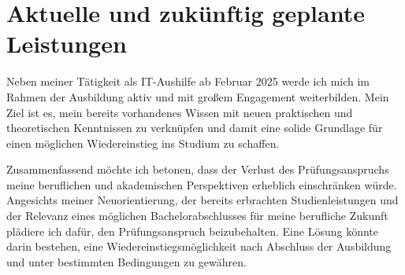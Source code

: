 \documentclass[a4paper,12pt]{article}
\begin{document}
\section*{\normalsize Aktuelle und zukünftig geplante Leistungen}
Neben meiner Tätigkeit als IT-Aushilfe ab Februar 2025 werde ich mich im Rahmen der Ausbildung aktiv und mit großem Engagement weiterbilden.
Mein Ziel ist es, mein bereits vorhandenes Wissen mit neuen praktischen und theoretischen Kenntnissen zu verknüpfen und damit eine solide Grundlage für einen möglichen Wiedereinstieg ins Studium zu schaffen.

Zusammenfassend möchte ich betonen, dass der Verlust des Prüfungsanspruchs meine beruflichen und akademischen Perspektiven erheblich einschränken würde.
Angesichts meiner Neuorientierung, der bereits erbrachten Studienleistungen und der Relevanz eines möglichen Bachelorabschlusses für meine berufliche Zukunft plädiere ich dafür, den Prüfungsanspruch beizubehalten.
Eine Lösung könnte darin bestehen, eine Wiedereinstiegsmöglichkeit nach Abschluss der Ausbildung und unter bestimmten Bedingungen zu gewähren.
\end{document}
